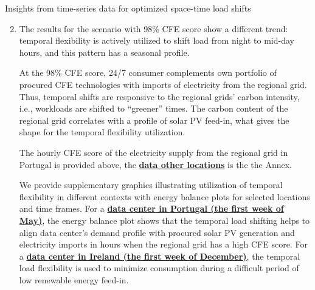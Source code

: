 \begin{frame}{Insights from time-series data for optimized space-time load shifts}

  {\footnotesize 

  \begin{enumerate}
    \setcounter{enumi}{1}
    \item The results for the scenario with 98\% CFE score show a different trend: temporal flexibility is actively utilized to shift load from night to mid-day hours, and this pattern has a seasonal profile.

    \vspace{0.1cm}
    At the 98\% CFE score, 24/7 consumer complements own portfolio of procured CFE technologies with imports of electricity from the regional grid. Thus, temporal shifts are \alert{responsive to the regional grids' carbon intensity}, i.e., workloads are shifted to \enquote{greener} times. The carbon content of the regional grid correlates with a profile of solar PV feed-in, what gives the shape for the temporal flexibility utilization. 
    
    \vspace{0.1cm}
    The hourly CFE score of the electricity supply from the regional grid in Portugal is provided above, the {\bf \hyperlink{CFEheatmaps}{data other locations}} is the the Annex.

    \vspace{0.1cm}
    We provide supplementary graphics illustrating utilization of temporal flexibility in different contexts with energy balance plots for selected locations and time frames. For a {\bf \hyperlink{nbtemp-40-PT}{data center in Portugal (the first week of May)}}, the energy balance plot shows that the temporal load shifting helps to align data center's demand profile with procured solar PV generation and electricity imports in hours when the regional grid has a high CFE score. For a {\bf \hyperlink{nbtemp-40-PT}{data center in Ireland (the first week of December)}}, the temporal load flexibility is used to minimize consumption during a difficult period of low renewable energy feed-in.

  \end{enumerate}
  }
\end{frame}


